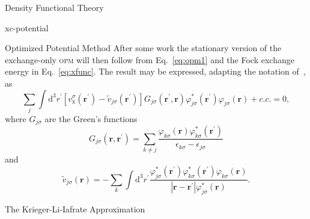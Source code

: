 \documentclass[a5paper, 9 pt]{extreport}
\begin{document}
\begin{chapter}{Density Functional Theory \label{chap:dft}}
\begin{section}{xc-potential \label{sec:xcpot}}
\begin{subsection}{Optimized Potential Method \label{sec:opm}}
         After some work the stationary version of the exchange-only \textsc{opm} will then follow from
         Eq.~\eqref{eq:opm1} and the Fock exchange energy in Eq.~\eqref{eq:xfunc}. The result may be
         expressed, adapting the notation of~\cite{klieq}, as
         \begin{equation} \label{eq:opmEq}
            \sum\limits_j \int \mathrm{d}^3 r^\prime
            \left[ v^\sigma_\mathrm{x}(\mathbf{r}^\prime)
                 - \tilde{v}_{j \sigma} (\mathbf{r}^\prime) \right]
                 G_{j \sigma}(\mathbf{r}^\prime, \mathbf{r}) \varphi^*_{j \sigma} (\mathbf{r}^\prime)
                 \varphi_{j \sigma} (\mathbf{r}) + c.c. = 0,
         \end{equation}
         where $G_{j \sigma}$ are the Green's functions
         \begin{equation}
            G_{j \sigma}(\mathbf{r}, \mathbf{r}^\prime) = \sum\limits_{k \neq j}
            \frac{\varphi_{k \sigma} (\mathbf{r}) \varphi^*_{k \sigma} (\mathbf{r}^\prime)}
            {\epsilon_{k \sigma} - \epsilon_{j \sigma}}
         \end{equation}
         and
         \begin{equation} \label{eq:tildev}
            \tilde{v}_{j \sigma} (\mathbf{r}) =  - \sum\limits_k \int \mathrm{d}^3 r^\prime
               \frac{ \varphi^*_{j \sigma} (\mathbf{r}^\prime) \varphi^*_{k \sigma} (\mathbf{r}^\prime)
                      \varphi_{k \sigma} (\mathbf{r}) }
                      {\left| \mathbf{r} - \mathbf{r}^\prime \right| \varphi^*_{j \sigma} (\mathbf{r})}.
         \end{equation}

      \end{subsection}

      \begin{subsection}{The Krieger-Li-Iafrate Approximation \label{sec:kli}}


\end{subsection}
\end{section}
\end{chapter}
\end{document}
